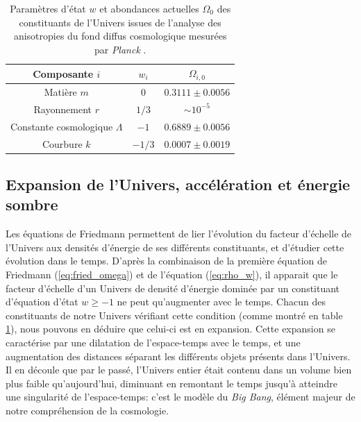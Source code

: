 \begin{table}[t]
    \small
    \centering
    \begin{tabular}{c c c}
        \toprule
        Composante $i$ & $w_i$ & $\Omega_{i,0}$ \\
        \midrule
        Matière $m$                         & $0$     & $0.3111 \pm 0.0056$ \\
        Rayonnement $r$                     & $1/3$   & $\sim 10^{-5}$ \\
        Constante cosmologique $\Lambda$    & $-1$    & $0.6889 \pm 0.0056$ \\
        Courbure $k$                        & $-1/3$  & $0.0007 \pm 0.0019$ \\
        \bottomrule
    \end{tabular}
    \caption{%
        Paramètres d'état $w$ et abondances actuelles $\Omega_0$ des constituants de l'Univers issues de l'analyse des anisotropies du fond diffus cosmologique mesurées par \textit{Planck} \cite{planck_collaboration_planck_2020}.
    }
    \label{tab:cosmo_params}
\end{table}

\subsection{Expansion de l'Univers, accélération et énergie sombre}
\label{sec:dark_energy}

Les équations de Friedmann permettent de lier l'évolution du facteur d'échelle de l'Univers aux densités d'énergie de ses différents constituants, et d'étudier cette évolution dans le temps.
D'après la combinaison de la première équation de Friedmann (\ref{eq:fried_omega}) et de l'équation (\ref{eq:rho_w}), il apparait que le facteur d'échelle d'un Univers de densité d'énergie dominée par un constituant d'équation d'état $w \geqslant -1$ ne peut qu'augmenter avec le temps.
Chacun des constituants de notre Univers vérifiant cette condition (comme montré en table \ref{tab:cosmo_params}), nous pouvons en déduire que celui-ci est en expansion.
Cette expansion se caractérise par une dilatation de l'espace-temps avec le temps, et une augmentation des distances séparant les différents objets présents dans l'Univers.
Il en découle que par le passé, l'Univers entier était contenu dans un volume bien plus faible qu'aujourd'hui, diminuant en remontant le temps jusqu'à atteindre une singularité de l'espace-temps: c'est le modèle du \textit{Big Bang}, élément majeur de notre compréhension de la cosmologie.

